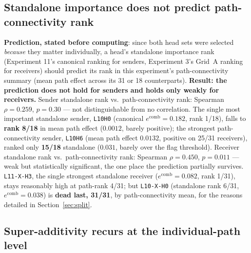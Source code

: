 \documentclass[11pt]{article}
\newcommand{\comb}{\ensuremath{e^{\mathrm{comb}}}}
\begin{document}
\subsection{Standalone importance does not predict path-connectivity rank}

\textbf{Prediction, stated before computing}: since both head sets were
selected \emph{because} they matter individually, a head's standalone
importance rank (Experiment 11's canonical ranking for senders, Experiment
3's Grid~A ranking for receivers) should predict its rank in this
experiment's path-connectivity summary (mean path effect across its 31 or 18
counterparts). \textbf{Result: the prediction does not hold for senders and
holds only weakly for receivers.} Sender standalone rank vs.\ path-connectivity
rank: Spearman $\rho = 0.259$, $p = 0.30$ — not distinguishable from no
correlation. The single most important standalone sender, \texttt{L10H0}
(canonical $\comb = 0.182$, rank 1/18), falls to \textbf{rank 8/18} in mean
path effect ($0.0012$, barely positive); the strongest path-connectivity
sender, \texttt{L10H6} (mean path effect $0.0132$, positive on 25/31
receivers), ranked only \textbf{15/18} standalone ($0.031$, barely over the
flag threshold). Receiver standalone rank vs.\ path-connectivity rank:
Spearman $\rho = 0.450$, $p = 0.011$ — weak but statistically significant,
the one place the prediction partially survives. \texttt{L11-X-H3}, the
single strongest standalone receiver ($\comb = 0.082$, rank 1/31), stays
reasonably high at path-rank 4/31; but \texttt{L10-X-H0} (standalone rank
6/31, $\comb = 0.038$) is \textbf{dead last, 31/31}, by path-connectivity
mean, for the reasons detailed in Section~\ref{sec:split}.

\subsection{Super-additivity recurs at the individual-path level}
\end{document}
